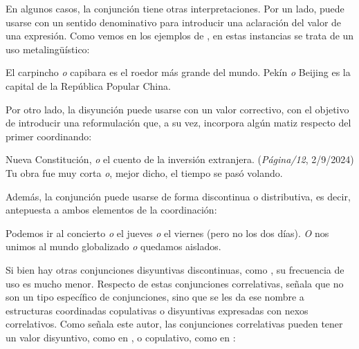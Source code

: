 En algunos casos, la conjunción  tiene otras interpretaciones. Por un
lado, puede usarse con un sentido denominativo para introducir una aclaración
del valor de una expresión. Como vemos en los ejemplos de
, en estas instancias se trata de un uso metalingüístico:

\begin{exe}
  \ex\label{ex:12-carpincho}
    \begin{xlist}
      \ex El carpincho \textit{o} capibara es el roedor más grande del mundo.
      \ex Pekín \textit{o} Beijing es la capital de la República Popular China.
    \end{xlist}
\end{exe}

Por otro lado, la disyunción puede usarse con un valor correctivo, con el
objetivo de introducir una reformulación que, a su vez, incorpora algún matiz
respecto del primer coordinando:

\begin{exe}
  \ex
    \begin{xlist}
      \ex Nueva Constitución, \textit{o} el cuento de la inversión extranjera.
          (\textit{Página/12}, 2/9/2024)
      \ex Tu obra fue muy corta \textit{o}, mejor dicho, el tiempo se pasó
          volando.
    \end{xlist}
\end{exe}

Además, la conjunción  puede usarse de forma discontinua o
distributiva, es decir, antepuesta a ambos elementos de la coordinación:

\begin{exe}
  \ex
    \begin{xlist}
      \ex Podemos ir al concierto \textit{o} el jueves \textit{o} el viernes
          (pero no los dos días).
      \ex \textit{O} nos unimos al mundo globalizado \textit{o} quedamos
          aislados.
    \end{xlist}
\end{exe}

Si bien hay otras conjunciones disyuntivas discontinuas, como , su frecuencia de uso es
mucho menor. Respecto de estas conjunciones correlativas,
\textcite[196]{jimenezjulia2023} señala que no son un tipo específico de
conjunciones, sino que se les da ese nombre a estructuras coordinadas
copulativas o disyuntivas expresadas con nexos correlativos. Como señala este
autor, las conjunciones correlativas pueden tener un valor disyuntivo, como en
\exref{ex:12-corr-a}, o copulativo, como en \exref{ex:12-corr-b}:

